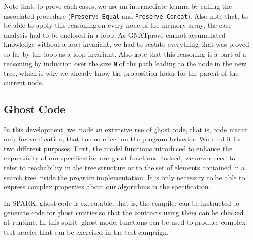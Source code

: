 \documentclass{llncs}
\newcommand{\gnatprove}{GNATprove\xspace}
\begin{document}
Note that, to prove each cases, we use an intermediate lemma by calling the associated procedure (\texttt{Preserve\_Equal} and \texttt{Preserve\_Concat}).
Also note that, to be able to apply this reasoning on every node of the memory array, the case
analysis had to be enclosed in a loop. As \gnatprove cannot accumulated knowledge without a loop
invariant, we had to restate everything that was proved so far by the loop as a loop invariant.
Also note that this reasoning is a part of a reasoning by induction over the size \texttt{N} of the path
leading to the node in the new tree, which is why we already know the proposition holds for the
parent of the current node.

\subsection{Ghost Code}



In this development, we made an extensive use of ghost code, that is, code meant only for verification,
that has no effect on the program behavior. We used it for two different purposes. First, the model
functions introduced to enhance the expressivity of our specification are ghost functions. Indeed, we
never need to refer to reachability in the tree structure or to the set of elements contained in a
search tree inside the program implementation. It is only necessary to be able to express complex
properties about our algorithms in the specification.

In SPARK, ghost code is executable, that is, the compiler can be instructed to generate code for ghost
entities so that the contracts using them can be checked at runtime. In this spirit, ghost model functions
can be used to produce complex test oracles that can be exercised in the test campaign.
\end{document}
